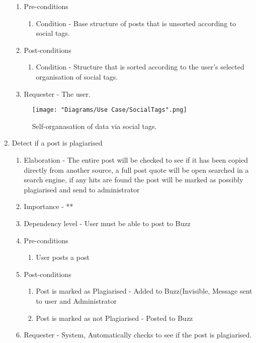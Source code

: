 \documentclass[12pt]{article}
\begin{document}
\begin{enumerate}
\begin{enumerate}
    \item Pre-conditions
    \begin{enumerate}
    	\item Condition - Base structure of posts that is unsorted according to social tags.
    \end{enumerate}
        \item Post-conditions
    \begin{enumerate}
    	\item Condition - Structure that is sorted according to the user's selected organisation of social tags.
    \end{enumerate}
    \item Requester - The user.
  \end{enumerate}
\clearpage %
    \begin{figure}[h]
    	\centering
    	\texttt{[image: "Diagrams/Use Case/SocialTags".png]}
    	\caption{Self-organasation of data via social tags.}
    \end{figure}
\clearpage %
   \item Detect if a post is plagiarised  %
  \begin{enumerate}
    \item Elaboration - The entire post will be checked to see if it has been copied directly from another source, a full post quote will be open searched in a search engine, if any hits are found the post will be marked as possibly plagiarised and send to administrator
    \item Importance - **
    \item Dependency level - User must be able to post to Buzz
    \item Pre-conditions
    \begin{enumerate}
    	\item User posts a post
    \end{enumerate}
        \item Post-conditions
    \begin{enumerate}
    	\item Post is marked as Plagiarised - Added to Buzz(Invisible, Message sent to user and Administrator
    	\item Post is marked as not Plagiarised - Posted to Buzz
    \end{enumerate}
    \item Requester - System, Automatically checks to see if the post is plagiarised.

\end{enumerate}
\end{enumerate}
\end{document}
